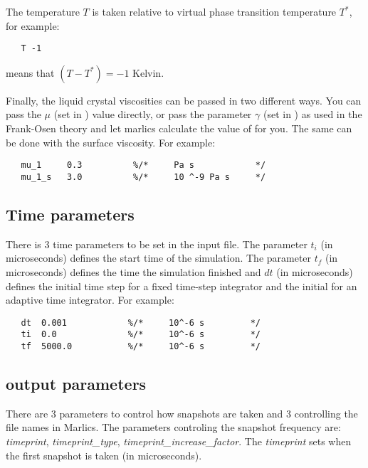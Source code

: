 \documentclass{article}
\begin{document}
The temperature $T$  is taken relative to virtual phase transition temperature $T^*$, for example:

\begin{lstlisting}
   T -1
\end{lstlisting}
means that $(T-T^*)=-1$ Kelvin.

Finally, the liquid crystal viscosities can be passed in two different ways. You can pass the $\mu$ (set in ) value directly, or pass the parameter $\gamma$ (set in ) as used in the Frank-Osen theory and let marlics calculate the value of  for you. The same can be done with the surface viscosity. For example:
\begin{lstlisting}
   mu_1     0.3          %/*     Pa s            */
   mu_1_s   3.0          %/*     10 ^-9 Pa s     */
\end{lstlisting}


\subsection{Time parameters}\label{time.param}

There is 3 time parameters to be set in the input file.  {The parameter $t_i$ (in microseconds) defines the start time of the simulation. The parameter $t_f$ (in microseconds) defines the time the simulation finished and $dt$ (in microseconds) defines the initial time step for a fixed time-step integrator and the initial for an adaptive time integrator}. For example:
\begin{lstlisting}
   dt  0.001            %/*     10^-6 s         */	
   ti  0.0              %/*     10^-6 s         */	
   tf  5000.0           %/*     10^-6 s         */
\end{lstlisting}


\subsection{output parameters}\label{snapshot.param}


There are 3 parameters to control how snapshots are taken and 3 controlling the file names in Marlics. The parameters controling the snapshot frequency are: \textit{timeprint}, \textit{timeprint_type}, \textit{timeprint_increase_factor}. The \textit{timeprint} sets when the first snapshot is taken (in microseconds). 
\end{document}
